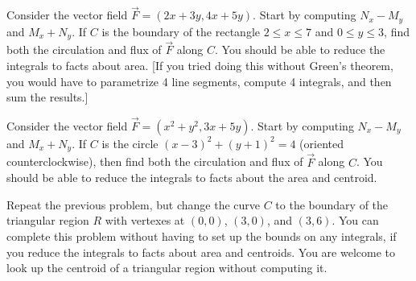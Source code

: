 \begin{problem}
%
 Consider the vector field $\vec F=(2x+3y,4x+5y)$. Start by computing $N_x-M_y$ and $M_x+N_y$. 
 If $C$ is the boundary of the rectangle $2\leq x\leq 7$ and $0\leq y\leq 3$, find both the circulation and flux of $\vec F$ along $C$. You should be able to reduce the integrals to facts about area. [If you tried doing this without Green's theorem, you would have to parametrize 4 line segments, compute 4 integrals, and then sum the results.]
\end{problem}

\begin{problem}
 Consider the vector field $\vec F=(x^2+y^2,3x+5y)$. Start by computing $N_x-M_y$ and $M_x+N_y$. 
 If $C$ is the circle $(x-3)^2+(y+1)^2=4$ (oriented counterclockwise), then find both the circulation and flux of $\vec F$ along $C$. You should be able to reduce the integrals to facts about the area and centroid.
\end{problem}

\begin{problem}
Repeat the previous problem, but change the curve $C$ to the boundary of the triangular region $R$ with vertexes at $(0,0)$, $(3,0)$, and $(3,6)$.  You can complete this problem without having to set up the bounds on any integrals, if you reduce the integrals to facts about area and centroids. You are welcome to look up the centroid of a triangular region without computing it.
\end{problem}


